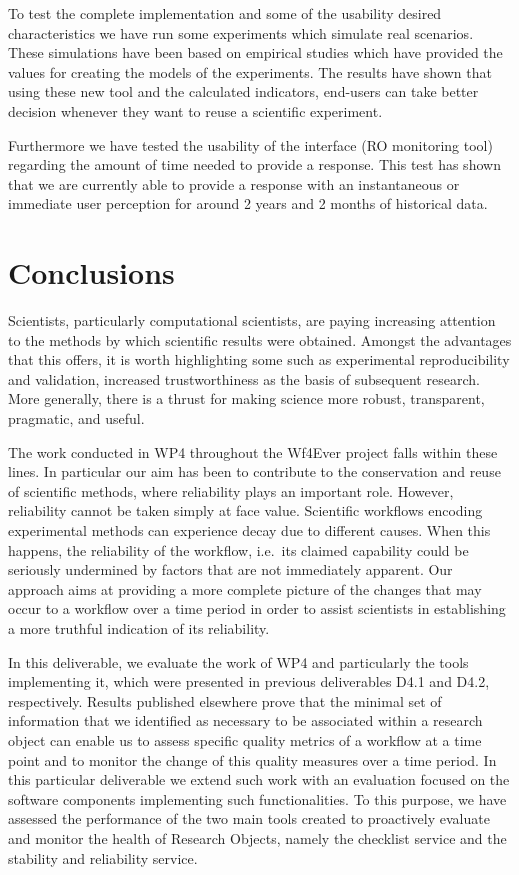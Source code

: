 To test the complete implementation and some of the usability desired
characteristics we have run some experiments which simulate real
scenarios. These simulations have been based on empirical studies which
have provided the values for creating the models of the experiments. The
results have shown that using these new tool and the calculated
indicators, end-users can take better decision whenever they want to
reuse a scientific experiment.

Furthermore we have tested the usability of the interface (RO monitoring
tool) regarding the amount of time needed to provide a response. This
test has shown that we are currently able to provide a response with an
instantaneous or immediate user perception for around 2 years and 2
months of historical data.

\section{Conclusions}

Scientists, particularly computational scientists, are paying increasing
attention to the methods by which scientific results were obtained.
Amongst the advantages that this offers, it is worth highlighting some
such as experimental reproducibility and validation, increased
trustworthiness as the basis of subsequent research. More generally,
there is a thrust for making science more robust, transparent,
pragmatic, and useful.

The work conducted in WP4 throughout the Wf4Ever project falls within
these lines. In particular our aim has been to contribute to the
conservation and reuse of scientific methods, where reliability plays an
important role. However, reliability cannot be taken simply at face
value. Scientific workflows encoding experimental methods can experience
decay due to different causes. When this happens, the reliability of the
workflow, i.e.~its claimed capability could be seriously undermined by
factors that are not immediately apparent. Our approach aims at
providing a more complete picture of the changes that may occur to a
workflow over a time period in order to assist scientists in
establishing a more truthful indication of its reliability.

In this deliverable, we evaluate the work of WP4 and particularly the
tools implementing it, which were presented in previous deliverables
D4.1 and D4.2, respectively. Results published elsewhere
\cite{wf_history} prove that the minimal set of information that we
identified as necessary to be associated within a research object can
enable us to assess specific quality metrics of a workflow at a time
point and to monitor the change of this quality measures over a time
period. In this particular deliverable we extend such work with an
evaluation focused on the software components implementing such
functionalities. To this purpose, we have assessed the performance of
the two main tools created to proactively evaluate and monitor the
health of Research Objects, namely the checklist service and the
stability and reliability service.

